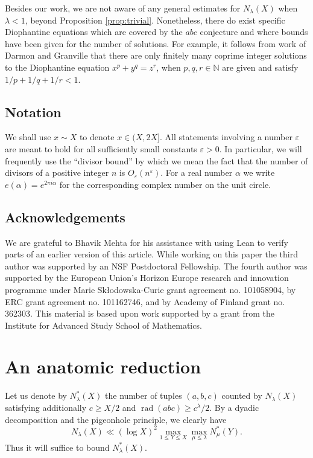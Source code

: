 \documentclass[a4paper,11pt,twoside,reqno]{amsart}
\renewcommand{\leq}{\leqslant}
\renewcommand{\geq}{\geqslant}
\renewcommand{\ge}{\geqslant}
\theoremstyle{plain}
\theoremstyle{remark}
\DeclareMathOperator\rad{rad}
\numberwithin{prop}{section}
\numberwithin{equation}{section}
\begin{document}
Besides our work, we are not aware of any general estimates for $N_\lambda(X)$ when $\lambda<1$, 
 beyond  Proposition \ref{prop:trivial}. Nonetheless, there do exist    specific Diophantine equations which are covered by the $abc$ conjecture and where bounds have been given for the number of solutions. 
For example, it follows from work of Darmon and 
Granville \cite{DG} that there are only finitely many coprime integer solutions to the Diophantine equation $x^p+y^q=z^r$, when $p,q,r\in \mathbb{N}$ are given and satisfy $1/p+1/q+1/r<1$.






\subsection*{Notation}
We shall use $x\sim X$ to denote $x\in (X,2X]$.
All statements involving a number $\varepsilon$ are meant to hold for all sufficiently small constants $\varepsilon>0$.
In particular, we will frequently use the ``divisor bound'' by which we mean the fact that the number of divisors of a positive integer $n$ is $O_{\varepsilon}(n^{\varepsilon})$.
For a real number $\alpha$ we write $e(\alpha)=e^{2\pi  i\alpha}$ for the corresponding complex number on the unit circle.


\subsection*{Acknowledgements}
We are grateful to Bhavik Mehta for his assistance with using Lean to verify parts of an earlier version of this article. 
While working on this paper
the third author was supported by an NSF Postdoctoral Fellowship.
The fourth author was supported by the European Union's Horizon
Europe research and innovation programme under Marie Sk\l{}odowska-Curie grant agreement no. 101058904, by ERC grant agreement no. 101162746, and by Academy of Finland grant no. 362303. 
 This material is based upon work supported by a grant from the Institute
for Advanced Study School of Mathematics. 




\section{An anatomic reduction}

Let us denote by $N_{\lambda}^*(X)$ the number of tuples $(a,b,c)$ counted by $N_{\lambda}(X)$ satisfying additionally $c \ge X/2$ and $\rad(abc)\geq c^{\lambda}/2$.
By a dyadic decomposition and the pigeonhole principle, we clearly have
\[
N_{\lambda}(X) \ll (\log X)^2 \max_{1\leq Y\leq X}\max_{\mu\leq \lambda}N_{\mu}^*(Y).
\]
Thus it will suffice  to bound $N_{\lambda}^*(X)$. 
\end{document}
